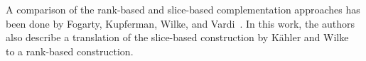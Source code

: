 A comparison of the rank-based and slice-based complementation approaches has been done by Fogarty, Kupferman, Wilke, and Vardi~\cite{fogarty2013unifying}. In this work, the authors also describe a translation of the slice-based construction by Kähler and Wilke~\cite{2008_kaehler} to a rank-based construction.












